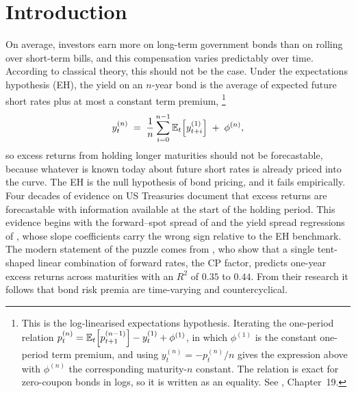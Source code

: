 \chapter{Introduction}
\label{ch:intro}

On average, investors
earn more on long-term government bonds than on rolling over short-term
bills, and this compensation varies predictably over time. According to
classical theory, this should not be the case. Under the expectations
hypothesis (EH), the yield on an $n$-year bond is the average of expected
future short rates plus at most a constant term premium,%
\footnote{This is the log-linearised expectations hypothesis. Iterating the
  one-period relation
  $p^{(n)}_{t}=\mathbb{E}_{t}\!\left[p^{(n-1)}_{t+1}\right]-y^{(1)}_{t}+\phi^{(1)}$,
  in which $\phi^{(1)}$ is the constant one-period term premium, and using
  $y^{(n)}_{t}=-p^{(n)}_{t}/n$ gives the expression above with
  $\phi^{(n)}$ the corresponding maturity-$n$ constant. The relation is exact
  for zero-coupon bonds in logs, so it is written as an equality. See
  \citet{cochrane2005book}, Chapter~19.}
\begin{equation*}
  y^{(n)}_{t} \;=\; \frac{1}{n}\sum_{i=0}^{n-1}
  \mathbb{E}_{t}\!\left[y^{(1)}_{t+i}\right] \;+\; \phi^{(n)},
\end{equation*}
so excess returns from holding longer maturities should not be forecastable,
because whatever is known today about future short rates is already priced
into the curve. The EH is the null hypothesis of bond pricing, and it fails empirically. Four decades of evidence on US Treasuries
document that excess returns are forecastable with information available at
the start of the holding period. This evidence begins with the forward--spot
spread of \citet{famabliss1987} and the yield spread regressions of
\citet{campbell1991}, whose slope coefficients carry the wrong sign relative
to the EH benchmark. The modern statement of the puzzle comes from
\citet{cochrane2005}, who show that a single tent-shaped linear
combination of forward rates, the CP factor, predicts one-year excess
returns across maturities with an $R^{2}$ of $0.35$ to $0.44$. From their
research it follows that bond risk premia are time-varying and
countercyclical.

